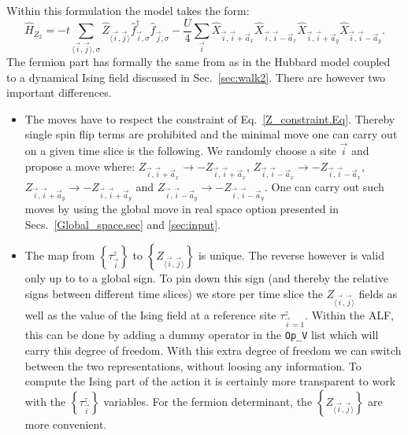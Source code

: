  
 Within this formulation  the model  takes  the form: 
 \begin{equation}
 	 \hat{H}_{Z_2}= -t \sum_{\langle \vec{i}, \vec{j} \rangle, \sigma }  \hat{Z}_{\langle \vec{i}, \vec{j} \rangle } \hat{f}^{\dagger}_{\vec{i},\sigma} \hat{f}^{\phantom{\dagger}}_{\vec{j},\sigma}   -  \frac{U}{4}  \sum_{\vec{i}}  \hat{X}_{\vec{i},\vec{i} +  \vec{a}_x} \hat{X}_{\vec{i},\vec{i} -  \vec{a}_x} \hat{X}_{\vec{i},\vec{i} +  \vec{a}_y} \hat{X}_{\vec{i},\vec{i} -  \vec{a}_y}.
 \end{equation}
The fermion part has formally the same from  as in the Hubbard model coupled to  a dynamical Ising field  discussed in Sec.~\ref{sec:walk2}.   There are however two important differences.
\begin{itemize}
\item The moves have to respect the constraint of Eq.~\ref{Z_constraint.Eq}. Thereby single spin flip terms are prohibited and the minimal move one can carry out on  a given time slice is the following. We randomly choose a site $\vec{i} $ and  propose a move where: 
$ Z_{\vec{i},\vec{i} +  \vec{a}_x} \rightarrow - Z_{\vec{i},\vec{i} +  \vec{a}_x} $,  $ Z_{\vec{i},\vec{i} -  \vec{a}_x} \rightarrow - Z_{\vec{i},\vec{i} -  \vec{a}_x} $,
$ Z_{\vec{i},\vec{i} +  \vec{a}_y} \rightarrow - Z_{\vec{i},\vec{i} +  \vec{a}_y} $ and $ Z_{\vec{i},\vec{i} -  \vec{a}_y} \rightarrow - Z_{\vec{i},\vec{i} -  \vec{a}_y} $.  One can carry out such moves by using the global move in real space option presented in Secs.~\ref{Global_space.sec} and \ref{sec:input}.
\item The map from  $ \left\{ \tau^{z}_{\vec{i}}  \right\} $ to $ \left\{ Z_{\langle \vec{i}, \vec{j} \rangle } \right\} $  is unique.  The reverse however  is valid only up to  to a global sign.  To pin down this sign  (and thereby   the  relative signs between different time slices)  we  store per time slice the $  Z_{\langle \vec{i},\vec{j} \rangle } $ fields as well as the value of the Ising field  at  a reference site $\tau^{z}_{\vec{i} = 1} $. Within the ALF, this can be done by adding a dummy operator in the \texttt{Op\_V}  list which will carry this degree of freedom.    With this extra degree of freedom we can switch  between the two representations, without loosing any information.   To compute the Ising part of the action it is certainly more transparent to work  with the $ \left\{ \tau^{z}_{\vec{i}}  \right\} $  variables. For the  fermion determinant,  the $ \left\{ Z_{\langle \vec{i}, \vec{j} \rangle } \right\} $   are more convenient. 
 \end{itemize}
 
